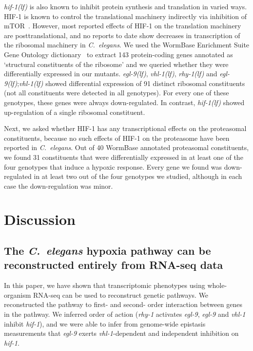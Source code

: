 \documentclass[9pt,twocolumn,twoside]{pnas-new}
\newcommand{\cel}{\emph{C.~elegans}}
\newcommand{\gene}[1]{\emph{#1}}
\newcommand{\egl}{\emph{egl-9(lf)}}
\newcommand{\rhy}{\emph{rhy-1(lf)}}
\newcommand{\vhl}{\emph{vhl-1(lf)}}
\newcommand{\hif}{\emph{hif-1(lf)}}
\newcommand{\hifp}{HIF-1}
\begin{document}
\hif{} is also known to inhibit protein synthesis and translation in varied ways.
\hifp{} is known to control the translational machinery indirectly
via inhibition of mTOR~\cite{Brugarolas2004}. However, most reported effects of
\hifp{} on the translation machinery are posttranslational, and no reports to date
show decreases in transcription of the ribosomal machinery in \cel{}. We used
the WormBase Enrichment Suite Gene Ontology dictionary~\cite{Angeles-Albores2016b}
to extract 143 protein-coding genes annotated as
`structural constituents of the ribosome' and we queried whether they were
differentially expressed in our mutants. \egl{}, \vhl{}, \rhy{} and \egl{};\vhl{}
showed differential expression of 91 distinct ribosomal constituents (not all
constituents were detected in all genotypes). For every one of these genotypes,
these genes were always down-regulated. In contrast, \hif{} showed up-regulation
of a single ribosomal constituent.

Next, we asked whether \hifp{} has any transcriptional effects on the
proteasomal constituents, because no such effects of \hifp{} on the proteasome
have been reported in \cel{}. Out of 40 WormBase annotated proteasomal constituents,
we found 31 constituents that were differentially expressed in at least one of the
four genotypes that induce a hypoxic response. Every gene we found was down-regulated
in at least two out of the four genotypes we studied, although in each case the
down-regulation was minor.

\section*{Discussion}
\subsection*{The \cel{} hypoxia pathway can be reconstructed entirely from
             RNA-seq data}
In this paper, we have shown that transcriptomic phenotypes using whole-organism
RNA-seq can be used to reconstruct genetic pathways. We reconstructed the
pathway to first- and second- order interaction between genes in the pathway.
We inferred order of action (\gene{rhy-1} activates \gene{egl-9}, \gene{egl-9} and
\gene{vhl-1} inhibit \gene{hif-1}), and we were able to infer from genome-wide
epistasis measurements that \gene{egl-9} exerts \gene{vhl-1}-dependent and
independent inhibition on \gene{hif-1}.
\end{document}
